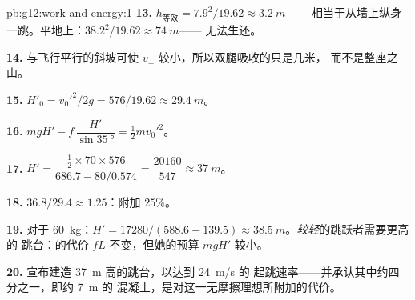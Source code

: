\begin{solution}{pb:g12:work-and-energy:1}
\textbf{13.} $h_{\text{等效}} = 7.9^2/19.62 \approx \qty{3.2}{m}$——
相当于从墙上纵身一跳。平地上：$38.2^2/19.62 \approx \qty{74}{m}$——
无法生还。

\textbf{14.} 与飞行平行的斜坡可使 $v_\perp$
较小，所以双腿吸收的只是几米，
而不是整座之山。

\textbf{15.} $H'_0 = v_0'^2/2g = 576/19.62 \approx \qty{29.4}{m}$。

\textbf{16.} $mgH' - f\,\dfrac{H'}{\sin\qty{35}{\degree}} =
\tfrac12 m v_0'^2$。

\textbf{17.} $H' = \dfrac{\tfrac12 \times 70 \times 576}
{686.7 - 80/0.574} = \dfrac{\num{20160}}{547} \approx \qty{37}{m}$。

\textbf{18.} $36.8/29.4 \approx 1.25$：附加 $25\%$。

\textbf{19.} 对于 \qty{60}{kg}：$H' = \num{17280}/(588.6 - 139.5)
\approx \qty{38.5}{m}$。\emph{较轻}的跳跃者需要更高的
跳台：的代价 $fL$ 不变，但她的预算
$mgH'$ 较小。

\textbf{20.} 宣布建造 \qty{37}{m} 高的跳台，以达到 \qty{24}{m/s} 的
起跳速率——并承认其中约四分之一，即约 \qty{7}{m} 的
混凝土，是对这一无摩擦理想所附加的代价。
\end{solution}
